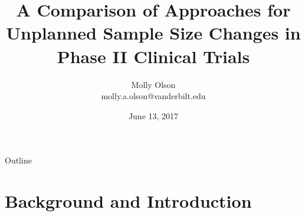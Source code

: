 \documentclass{beamer}\usepackage[]{graphicx}\usepackage[]{color}
\title[]{A Comparison of Approaches for Unplanned Sample Size Changes in Phase II Clinical Trials}
\author{Molly Olson \\ \small molly.a.olson@vanderbilt.edu}
\institute{Vanderbilt University}
\date{June 13, 2017}
\begin{document}
\frame{\titlepage}


\begin{frame}{Outline}
  \tableofcontents
\end{frame}

% 

\section{Background and Introduction}
\end{document}
